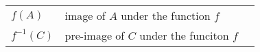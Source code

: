 \begin{tabular}{p{1in} p{2.5in} l}
$f ( A )$        &  image of $A$ under the function $f$  &  \pageref{sym:fofA} \\
$f^{-1} ( C )$   &  pre-image of $C$ under the funciton $f$ & \pageref{sym:preimage} \\

\end{tabular}

\endinput
